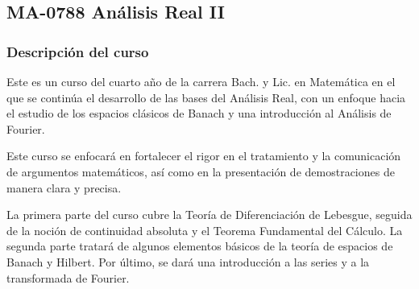 \newpage
\subsection*{MA-0788 Análisis Real II}

\hypertarget{MA0788}{}
\begin{refsection}
\begin{table}[H]
\end{table}



\subsubsection*{Descripción del curso}

Este es un curso del cuarto año de la carrera Bach. y Lic. en Matemática en el que se continúa el desarrollo de las bases del Análisis Real, con un enfoque hacia el estudio de los espacios clásicos de Banach y una introducción al Análisis de Fourier.

Este curso se enfocará en fortalecer el rigor en el tratamiento y la comunicación de argumentos matemáticos, así como en la presentación de demostraciones de manera clara y precisa.

La primera parte del curso cubre la Teoría de Diferenciación de Lebesgue, seguida de la noción de continuidad absoluta y el Teorema Fundamental del Cálculo. La segunda parte tratará de algunos elementos básicos de la teoría de espacios de Banach y Hilbert. Por último, se dará una introducción a las series y a la transformada de Fourier.


\end{refsection}
